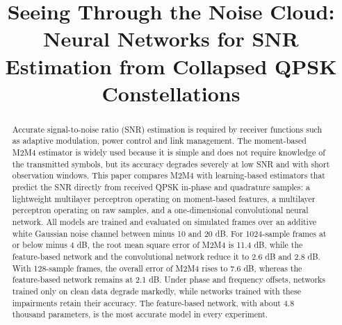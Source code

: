 \documentclass[conference]{IEEEtran}
\begin{document}
\title{Seeing Through the Noise Cloud: Neural Networks for SNR Estimation from Collapsed QPSK Constellations}

\author{
\and
{}
\and
{}
}

\maketitle

\begin{abstract}
Accurate signal-to-noise ratio (SNR) estimation is required by receiver functions such as adaptive modulation, power control and link management. The moment-based M2M4 estimator is widely used because it is simple and does not require knowledge of the transmitted symbols, but its accuracy degrades severely at low SNR and with short observation windows. This paper compares M2M4 with learning-based estimators that predict the SNR directly from received QPSK in-phase and quadrature samples: a lightweight multilayer perceptron operating on moment-based features, a multilayer perceptron operating on raw samples, and a one-dimensional convolutional neural network. All models are trained and evaluated on simulated frames over an additive white Gaussian noise channel between minus 10 and 20 dB. For 1024-sample frames at or below minus 4 dB, the root mean square error of M2M4 is 11.4 dB, while the feature-based network and the convolutional network reduce it to 2.6 dB and 2.8 dB. With 128-sample frames, the overall error of M2M4 rises to 7.6 dB, whereas the feature-based network remains at 2.1 dB. Under phase and frequency offsets, networks trained only on clean data degrade markedly, while networks trained with these impairments retain their accuracy. The feature-based network, with about 4.8 thousand parameters, is the most accurate model in every experiment.
\end{abstract}
\end{document}

